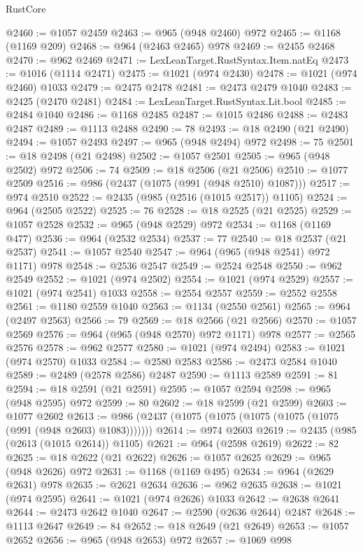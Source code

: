 \begin{lexlean}{RustCore}
\begin{coremodule}
@2460 := @1057 @2459
@2463 := @965 (@948 @2460) @972
@2465 := @1168 (@1169 @209)
@2468 := @964 (@2463 @2465) @978
@2469 := @2455 @2468
@2470 := @962 @2469
@2471 := LexLeanTarget.RustSyntax.Item.natEq
@2473 := @1016 (@1114 @2471)
@2475 := @1021 (@974 @2430)
@2478 := @1021 (@974 @2460) @1033
@2479 := @2475 @2478
@2481 := @2473 @2479 @1040
@2483 := @2425 (@2470 @2481)
@2484 := LexLeanTarget.RustSyntax.Lit.bool
@2485 := @2484 @1040
@2486 := @1168 @2485
@2487 := @1015 @2486
@2488 := @2483 @2487
@2489 := @1113 @2488
@2490 := 78
@2493 := @18 @2490 (@21 @2490)
@2494 := @1057 @2493
@2497 := @965 (@948 @2494) @972
@2498 := 75
@2501 := @18 @2498 (@21 @2498)
@2502 := @1057 @2501
@2505 := @965 (@948 @2502) @972
@2506 := 74
@2509 := @18 @2506 (@21 @2506)
@2510 := @1077 @2509
@2516 := @986 (@2437 (@1075 (@991 (@948 @2510) @1087)))
@2517 := @974 @2510
@2522 := @2435 (@985 (@2516 (@1015 @2517)) @1105)
@2524 := @964 (@2505 @2522)
@2525 := 76
@2528 := @18 @2525 (@21 @2525)
@2529 := @1057 @2528
@2532 := @965 (@948 @2529) @972
@2534 := @1168 (@1169 @477)
@2536 := @964 (@2532 @2534)
@2537 := 77
@2540 := @18 @2537 (@21 @2537)
@2541 := @1057 @2540
@2547 := @964 (@965 (@948 @2541) @972 @1171) @978
@2548 := @2536 @2547
@2549 := @2524 @2548
@2550 := @962 @2549
@2552 := @1021 (@974 @2502)
@2554 := @1021 (@974 @2529)
@2557 := @1021 (@974 @2541) @1033
@2558 := @2554 @2557
@2559 := @2552 @2558
@2561 := @1180 @2559 @1040
@2563 := @1134 (@2550 @2561)
@2565 := @964 (@2497 @2563)
@2566 := 79
@2569 := @18 @2566 (@21 @2566)
@2570 := @1057 @2569
@2576 := @964 (@965 (@948 @2570) @972 @1171) @978
@2577 := @2565 @2576
@2578 := @962 @2577
@2580 := @1021 (@974 @2494)
@2583 := @1021 (@974 @2570) @1033
@2584 := @2580 @2583
@2586 := @2473 @2584 @1040
@2589 := @2489 (@2578 @2586) @2487
@2590 := @1113 @2589
@2591 := 81
@2594 := @18 @2591 (@21 @2591)
@2595 := @1057 @2594
@2598 := @965 (@948 @2595) @972
@2599 := 80
@2602 := @18 @2599 (@21 @2599)
@2603 := @1077 @2602
@2613 := @986 (@2437 (@1075 (@1075 (@1075 (@1075 (@1075 (@991 (@948 @2603) @1083)))))))
@2614 := @974 @2603
@2619 := @2435 (@985 (@2613 (@1015 @2614)) @1105)
@2621 := @964 (@2598 @2619)
@2622 := 82
@2625 := @18 @2622 (@21 @2622)
@2626 := @1057 @2625
@2629 := @965 (@948 @2626) @972
@2631 := @1168 (@1169 @495)
@2634 := @964 (@2629 @2631) @978
@2635 := @2621 @2634
@2636 := @962 @2635
@2638 := @1021 (@974 @2595)
@2641 := @1021 (@974 @2626) @1033
@2642 := @2638 @2641
@2644 := @2473 @2642 @1040
@2647 := @2590 (@2636 @2644) @2487
@2648 := @1113 @2647
@2649 := 84
@2652 := @18 @2649 (@21 @2649)
@2653 := @1057 @2652
@2656 := @965 (@948 @2653) @972
@2657 := @1069 @998

\end{coremodule}
\end{lexlean}
